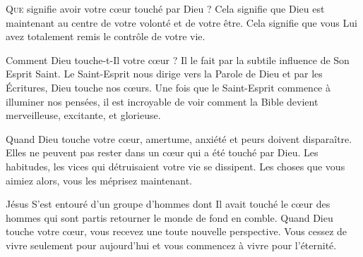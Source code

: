

\lettrine{Q}{ue} signifie avoir votre c\oe{}ur touché par Dieu ?
 Cela signifie que Dieu est maintenant au centre de votre volonté
 et de votre être.
 Cela signifie que vous Lui avez totalement remis le contrôle de votre vie.

Comment Dieu touche-t-Il votre c\oe{}ur ?
 Il le fait par la subtile influence de Son Esprit Saint. 
 Le Saint-Esprit nous dirige vers la Parole de Dieu et par les Écritures,
 Dieu touche nos c\oe{}urs.
 Une fois que le Saint-Esprit commence à illuminer nos pensées,
 il est incroyable de voir comment la Bible devient merveilleuse,
 excitante, et glorieuse.

Quand Dieu touche votre c\oe{}ur, amertume, anxiété et peurs doivent disparaître.
 Elles ne peuvent pas rester dans un c\oe{}ur qui a été touché par Dieu.
 Les habitudes, les vices qui détruisaient votre vie se dissipent.
 Les choses que vous aimiez alors, vous les méprisez maintenant.


Jésus S'est entouré d'un groupe d'hommes dont Il avait touché le c\oe{}ur
 \ocadr des hommes qui sont partis retourner le monde de fond en comble.
 Quand Dieu touche votre c\oe{}ur, vous recevez une toute nouvelle perspective.
 Vous cessez de vivre seulement pour aujourd'hui et vous commencez
 à vivre pour l'éternité. 

\dvrule







